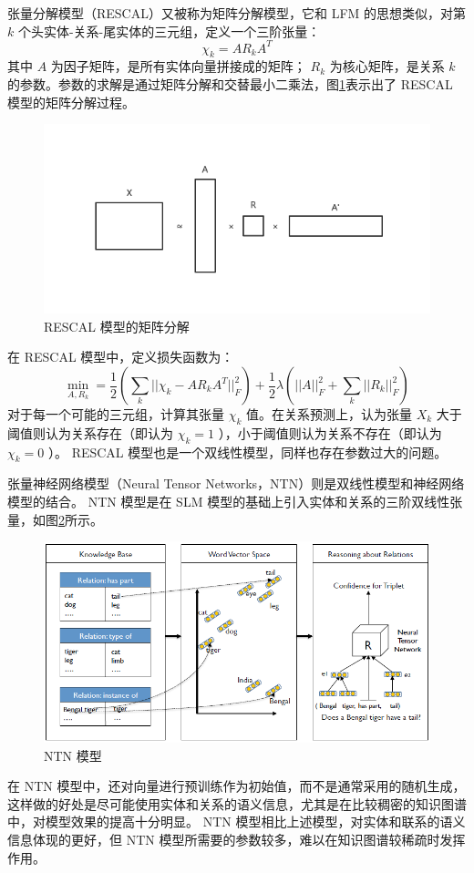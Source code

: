 \documentclass{llncs}
\begin{document}
张量分解模型（RESCAL）\cite{DBLP:conf/icml/NickelTK11}又被称为矩阵分解模型，它和 LFM 的思想类似，对第 $k$ 个头实体-关系-尾实体的三元组，定义一个三阶张量：
\begin{displaymath}
\chi_k=AR_kA^T
\end{displaymath}
其中 $A$ 为因子矩阵，是所有实体向量拼接成的矩阵； $R_k$ 为核心矩阵，是关系 $k$ 的参数。参数的求解是通过矩阵分解和交替最小二乘法，图\ref{fg:RESCAL}表示出了 RESCAL 模型的矩阵分解过程。

\begin{figure}
	\centering
	\includegraphics[width=0.8\columnwidth]{figures/RESCAL.png}
	\caption{ RESCAL 模型的矩阵分解}
	\label{fg:RESCAL}
\end{figure}

在 RESCAL 模型中，定义损失函数为：
\begin{displaymath}
\min_{A,R_k}=\frac{1}{2}(\sum_k||\chi_k-AR_kA^T||^2_F)+\frac{1}{2}\lambda(||A||^2_F+\sum_k||R_k||^2_F)
\end{displaymath}
对于每一个可能的三元组，计算其张量 $\chi_k$ 值。在关系预测上，认为张量 $X_k$ 大于阈值则认为关系存在（即认为 $\chi_k=1$ ），小于阈值则认为关系不存在（即认为 $\chi_k=0$ ）。 RESCAL 模型也是一个双线性模型，同样也存在参数过大的问题。

张量神经网络模型（Neural Tensor Networks，NTN）\cite{DBLP:conf/nips/SocherCMN13}则是双线性模型和神经网络模型的结合。 NTN 模型是在 SLM 模型的基础上引入实体和关系的三阶双线性张量，如图\ref{fg:NTN}所示。

\begin{figure}
	\centering
	\includegraphics[width=0.8\columnwidth]{figures/NTN.png}
	\caption{ NTN 模型}
	\label{fg:NTN}
\end{figure}
在 NTN 模型中，还对向量进行预训练作为初始值，而不是通常采用的随机生成，这样做的好处是尽可能使用实体和关系的语义信息，尤其是在比较稠密的知识图谱中，对模型效果的提高十分明显。 NTN 模型相比上述模型，对实体和联系的语义信息体现的更好，但 NTN 模型所需要的参数较多，难以在知识图谱较稀疏时发挥作用。
\end{document}
